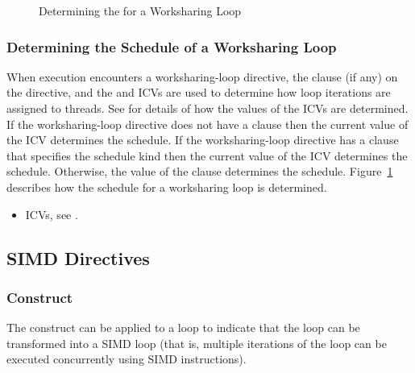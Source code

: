 \begin{figure}[h]
\begin{quote} %

\end{quote}
\caption{Determining the  for a Worksharing Loop\label{fig:schedule loop}}
\end{figure}


\subsubsection{Determining the Schedule of a Worksharing Loop}
\label{subsubsec:Determining the Schedule of a Worksharing Loop}
When execution encounters a worksharing-loop directive, the  clause (if any) on the
directive, and the  and  ICVs are used to determine how loop
iterations are assigned to threads. See
for details of how the
values of the ICVs are determined. If the worksharing-loop directive does not have a 
clause then the current value of the \mbox{} ICV determines the schedule. If the
worksharing-loop directive has a  clause that specifies the  schedule kind then
the current value of the  ICV determines the schedule. Otherwise, the
value of the  clause determines the schedule. Figure~\ref{fig:schedule loop}
describes how the schedule for a worksharing loop is determined.


\crossreferences
\begin{itemize}
\item ICVs, see .
\end{itemize}



\subsection{SIMD Directives}
\label{subsec:SIMD Directives}

\subsubsection{ Construct}
\label{subsubsec:simd Construct}
\summary
The  construct can be applied to a loop to indicate that the loop can be transformed
into a SIMD loop (that is, multiple iterations of the loop can be executed concurrently
using SIMD instructions).

